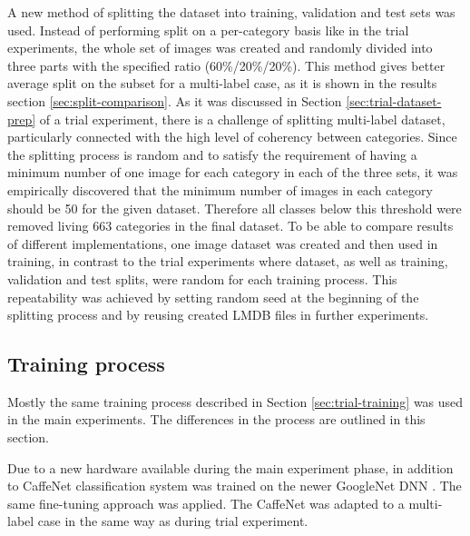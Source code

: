     A new method of splitting the dataset into training, validation and test sets was used. Instead of performing split on a per-category basis like in the trial experiments, the whole set of images was created and randomly divided into three parts with the specified ratio (60\%/20\%/20\%). This method gives better average split on the subset for a multi-label case, as it is shown in the results section \ref{sec:split-comparison}. As it was discussed in Section \ref{sec:trial-dataset-prep} of a trial experiment, there is a challenge of splitting multi-label dataset, particularly connected with the high level of coherency between categories. Since the splitting process is random and to satisfy the requirement of having a minimum number of one image for each category in each of the three sets, it was empirically discovered that the minimum number of images in each category should be 50 for the given dataset. Therefore all classes below this threshold were removed living 663 categories in the final dataset. To be able to compare results of different implementations, one image dataset was created and then used in training, in contrast to the trial experiments where dataset, as well as training, validation and test splits,  were random for each training process. This repeatability was achieved by setting random seed at the beginning of the splitting process and by reusing created LMDB files in further experiments.
    
    
    
    \subsection{Training process}
    \label{sec:main-training}
    Mostly the same training process described in Section \ref{sec:trial-training} was used in the main experiments. The differences in the process are outlined in this section. 
    
    Due to a new hardware available during the main experiment phase, in addition to CaffeNet classification system was trained on the newer GoogleNet DNN \cite{Szegedy2015GoingDeeper}. The same fine-tuning approach was applied. The CaffeNet was adapted to a multi-label case in the same way as during trial experiment.
    

